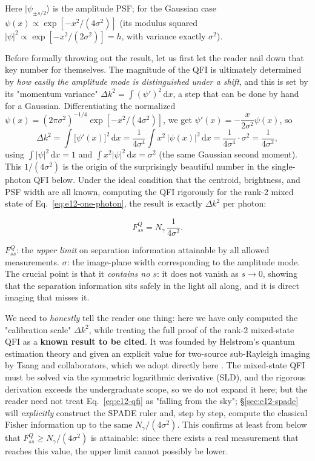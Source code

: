 Here $|\psi_{\pm s/2}\rangle$ is the amplitude PSF; for the Gaussian case $\psi(x)\propto\exp[-x^2/(4\sigma^2)]$ (its modulus squared $|\psi|^2\propto\exp[-x^2/(2\sigma^2)]=h$, with variance exactly $\sigma^2$).

Before formally throwing out the result, let us first let the reader nail down that key number for themselves. The magnitude of the QFI is ultimately determined by \emph{how easily the amplitude mode is distinguished under a shift}, and this is set by its "momentum variance" $\Delta k^2=\int(\psi')^2\,\mathrm{d}x$, a step that can be done by hand for a Gaussian. Differentiating the normalized $\psi(x)=(2\pi\sigma^2)^{-1/4}\exp[-x^2/(4\sigma^2)]$, we get $\psi'(x)=-\dfrac{x}{2\sigma^2}\psi(x)$, so
\[
  \Delta k^2=\int\big[\psi'(x)\big]^2\,\mathrm{d}x
  =\frac{1}{4\sigma^4}\int x^2\,|\psi(x)|^2\,\mathrm{d}x
  =\frac{1}{4\sigma^4}\cdot\sigma^2
  =\frac{1}{4\sigma^2},
\]
using $\int|\psi|^2\,\mathrm{d}x=1$ and $\int x^2|\psi|^2\,\mathrm{d}x=\sigma^2$ (the same Gaussian second moment). This $1/(4\sigma^2)$ is the origin of the surprisingly beautiful number in the single-photon QFI below. Under the ideal condition that the centroid, brightness, and PSF width are all known, computing the QFI rigorously for the rank-2 mixed state of Eq.~\eqref{eq:e12-one-photon}, the result is exactly $\Delta k^2$ per photon:

\begin{equation}
  F_{ss}^{Q}=N_\gamma\,\frac{1}{4\sigma^{2}}.
  \label{eq:e12-qfi}
\end{equation}
\begin{formulaexplain}
$F_{ss}^{Q}$: the \emph{upper limit} on separation information attainable by all allowed measurements. $\sigma$: the image-plane width corresponding to the amplitude mode. The crucial point is that it \emph{contains no $s$}: it does not vanish as $s\to0$, showing that the separation information sits safely in the light all along, and it is direct imaging that misses it.
\end{formulaexplain}

We need to \emph{honestly} tell the reader one thing: here we have only computed the "calibration scale" $\Delta k^2$, while treating the full proof of the rank-2 mixed-state QFI as a \textbf{known result to be cited}. It was founded by Helstrom's quantum estimation theory and given an explicit value for two-source sub-Rayleigh imaging by Tsang and collaborators, which we adopt directly here \citep{1969JSP.....1..231H,2016PhRvX...6c1033T}. The mixed-state QFI must be solved via the symmetric logarithmic derivative (SLD), and the rigorous derivation exceeds the undergraduate scope, so we do not expand it here; but the reader need not treat Eq.~\eqref{eq:e12-qfi} as "falling from the sky"; \S\ref{sec:e12-spade} will \emph{explicitly} construct the SPADE ruler and, step by step, compute the classical Fisher information up to the same $N_\gamma/(4\sigma^2)$. This confirms at least from below that $F_{ss}^{Q}\ge N_\gamma/(4\sigma^2)$ is attainable: since there exists a real measurement that reaches this value, the upper limit cannot possibly be lower.

